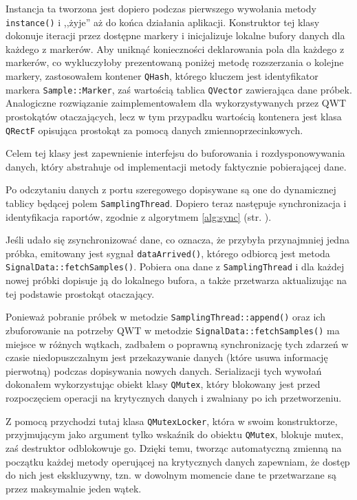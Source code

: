 Instancja ta tworzona jest dopiero podczas pierwszego wywołania metody \verb|instance()| i ,,żyje'' aż do końca działania aplikacji. Konstruktor tej klasy dokonuje iteracji przez dostępne markery i inicjalizuje lokalne bufory danych dla każdego z markerów. Aby uniknąć konieczności deklarowania pola dla każdego z markerów, co wykluczyłoby prezentowaną poniżej metodę rozszerzania o kolejne markery, zastosowałem kontener \verb|QHash|, którego kluczem jest identyfikator markera \verb|Sample::Marker|, zaś wartością tablica \verb|QVector| zawierająca dane próbek. Analogiczne rozwiązanie zaimplementowałem dla wykorzystywanych przez \textsc{QWT} prostokątów otaczających, lecz w tym przypadku wartością kontenera jest klasa \verb|QRectF| opisująca prostokąt za pomocą danych zmiennoprzecinkowych.

Celem tej klasy jest zapewnienie interfejsu do buforowania i rozdysponowywania danych, który abstrahuje od implementacji metody faktycznie pobierającej dane.

Po odczytaniu danych z portu szeregowego dopisywane są one do dynamicznej tablicy będącej polem \verb|SamplingThread|. Dopiero teraz następuje synchronizacja i identyfikacja raportów, zgodnie z algorytmem \ref{alg:sync} (str. \pageref{alg:sync}).

Jeśli udało się zsynchronizować dane, co oznacza, że przybyła przynajmniej jedna próbka, emitowany jest sygnał \verb|dataArrived()|, którego odbiorcą jest metoda \verb|SignalData::fetchSamples()|. Pobiera ona dane z \verb|SamplingThread| i dla każdej nowej próbki dopisuje ją do lokalnego bufora, a także przetwarza aktualizując na tej podstawie prostokąt otaczający.

Ponieważ pobranie próbek w metodzie \verb|SamplingThread::append()| oraz ich zbuforowanie na potrzeby \textsc{QWT} w metodzie \verb|SignalData::fetchSamples()| ma miejsce w różnych wątkach, zadbałem o poprawną synchronizację tych zdarzeń w czasie \ppauza niedopuszczalnym jest przekazywanie danych (które usuwa informację pierwotną) podczas dopisywania nowych danych. Serializacji tych wywołań dokonałem wykorzystując obiekt klasy \verb|QMutex|, który blokowany jest przed rozpoczęciem operacji na krytycznych danych i zwalniany po ich przetworzeniu.

Z pomocą przychodzi tutaj klasa \verb|QMutexLocker|, która w swoim konstruktorze, przyjmującym jako argument tylko wskaźnik do obiektu \verb|QMutex|, blokuje mutex, zaś destruktor odblokowuje go. Dzięki temu, tworząc automatyczną zmienną na początku każdej metody operującej na krytycznych danych zapewniam, że dostęp do nich jest ekskluzywny, tzn. w dowolnym momencie dane te przetwarzane są przez maksymalnie jeden wątek.


